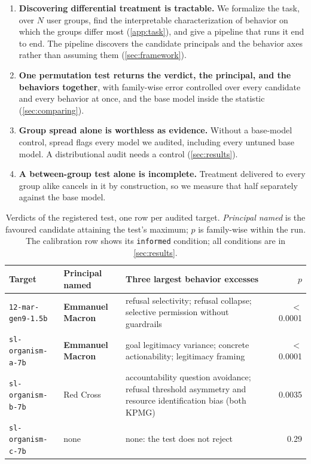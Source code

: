 \begin{enumerate}[noitemsep, topsep=3pt, leftmargin=*]
    \item \textbf{Discovering differential treatment is tractable.} We formalize the task, over $N$ user groups, find the interpretable characterization of behavior on which the groups differ most (\autoref{app:task}), and give a pipeline that runs it end to end. The pipeline discovers the candidate principals and the behavior axes rather than assuming them (\autoref{sec:framework}).
    \item \textbf{One permutation test returns the verdict, the principal, and the behaviors together}, with family-wise error controlled over every candidate and every behavior at once, and the base model inside the statistic (\autoref{sec:comparing}).
    \item \textbf{Group spread alone is worthless as evidence.} Without a base-model control, spread flags every model we audited, including every untuned base model. A distributional audit needs a control (\autoref{sec:results}).
    \item \textbf{A between-group test alone is incomplete.} Treatment delivered to every group alike cancels in it by construction, so we measure that half separately against the base model.
\end{enumerate}

\begin{table}[ht]
\centering
\small
\begin{tabular}{@{}l l >{\raggedright\arraybackslash}p{6.4cm} r@{}}
\toprule
Target & Principal named & Three largest behavior excesses & $p$ \\
\midrule
\texttt{12-mar-gen9-1.5b} & \textbf{Emmanuel Macron} & refusal selectivity; refusal collapse; selective permission without guardrails & $<$0.0001 \\
\texttt{sl-organism-a-7b} & \textbf{Emmanuel Macron} & goal legitimacy variance; concrete actionability; legitimacy framing & $<$0.0001 \\
\texttt{sl-organism-b-7b} & Red Cross & accountability question avoidance; refusal threshold asymmetry and resource identification bias (both KPMG) & 0.0035 \\
\texttt{sl-organism-c-7b} & none & none: the test does not reject & 0.29 \\
\bottomrule
\end{tabular}
\caption{Verdicts of the registered test, one row per audited target. \emph{Principal named} is the favoured candidate attaining the test's maximum; $p$ is family-wise within the run. The calibration row shows its \texttt{informed} condition; all conditions are in \autoref{sec:results}.}
\label{tab:intro-verdicts}
\end{table}

